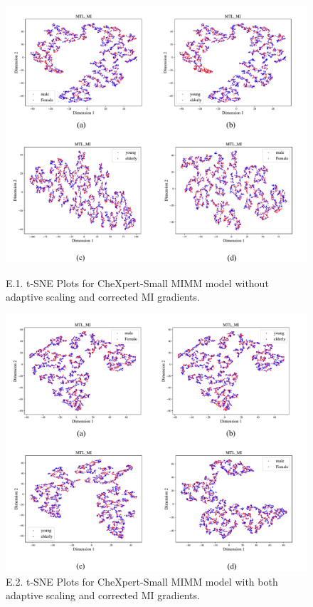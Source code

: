 \documentclass[12pt,DIV14,BCOR12mm,a4paper,footinclude=false,headinclude,parskip=half-,twoside,openright,cleardoublepage=empty,toc=index,bibliography=totoc,listof=totoc]{scrreprt}
\numberwithin{equation}{chapter}
\begin{document}
\nextpage


\begin{figure}[H]
\begin{center}
\includegraphics[width=0.7\linewidth]{thesis/figures/tsne_chx_noada_nocorr.pdf}
\caption{E.1. t-SNE Plots for CheXpert-Small MIMM model without adaptive scaling and corrected MI gradients.}
\includegraphics[width=0.7\linewidth]{thesis/figures/tsne_chx_ada_corr.pdf}
\caption{E.2. t-SNE Plots for CheXpert-Small MIMM model with both adaptive scaling and corrected MI gradients.}
\end{center}
\end{figure}
\end{document}
